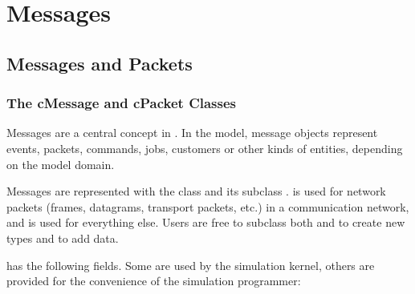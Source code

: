 \chapter{Messages}
\label{cha:messages}

\section{Messages and Packets}

\subsection{The cMessage and cPacket Classes}

Messages are a central concept in {\opp}. In the model, message objects
represent events, packets, commands, jobs, customers or other kinds of
entities, depending on the model domain.

Messages are represented with the  class and its subclass
.  is used for network packets (frames,
datagrams, transport packets, etc.) in a communication network, and
 is used for everything else. Users are free to subclass
both  and  to create new types and to
add data.

 has the following fields. Some are used by
the simulation kernel, others are provided for the convenience
of the simulation programmer:

